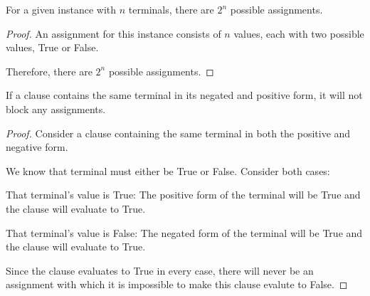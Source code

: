 \documentclass[manuscript]{acmart}
\begin{document}
    \begin{lemma}        
        For a given instance with $n$ terminals, there are $2^n$ possible assignments.
    \end{lemma}
    \begin{proof}
        An assignment for this instance consists of $n$ values, each with two possible
        values, True or False.

        Therefore, there are $2^n$ possible assignments.
    \end{proof}

    \begin{lemma}
        If a clause contains the same terminal in its negated and positive form, it will
        not block any assignments.
    \end{lemma}
    \begin{proof}

        Consider a clause containing the same terminal in both the positive and
        negative form.

        We know that terminal must either be True or False. Consider both cases:

        That terminal's value is True:
        The positive form of the terminal will be True and the clause will evaluate to True.

        That terminal's value is False:
        The negated form of the terminal will be True and the clause will evaluate to True.

        Since the clause evaluates to True in every case, there will never be an 
        assignment with which it is impossible to make this clause evalute to False.
    \end{proof}




\end{document}

